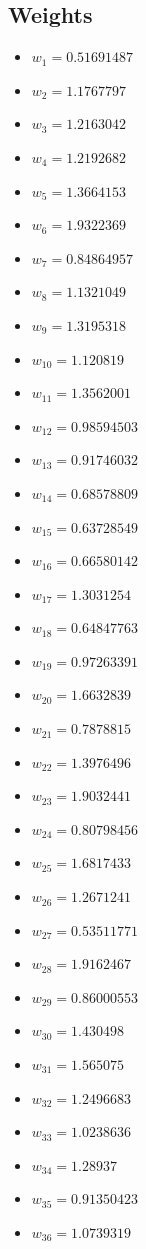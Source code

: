 \documentclass[11pt]{article}
\begin{document}
\subsection*{Weights}
\begin{itemize}
\item $w_{1} = 0.51691487$
\item $w_{2} = 1.1767797$
\item $w_{3} = 1.2163042$
\item $w_{4} = 1.2192682$
\item $w_{5} = 1.3664153$
\item $w_{6} = 1.9322369$
\item $w_{7} = 0.84864957$
\item $w_{8} = 1.1321049$
\item $w_{9} = 1.3195318$
\item $w_{10} = 1.120819$
\item $w_{11} = 1.3562001$
\item $w_{12} = 0.98594503$
\item $w_{13} = 0.91746032$
\item $w_{14} = 0.68578809$
\item $w_{15} = 0.63728549$
\item $w_{16} = 0.66580142$
\item $w_{17} = 1.3031254$
\item $w_{18} = 0.64847763$
\item $w_{19} = 0.97263391$
\item $w_{20} = 1.6632839$
\item $w_{21} = 0.7878815$
\item $w_{22} = 1.3976496$
\item $w_{23} = 1.9032441$
\item $w_{24} = 0.80798456$
\item $w_{25} = 1.6817433$
\item $w_{26} = 1.2671241$
\item $w_{27} = 0.53511771$
\item $w_{28} = 1.9162467$
\item $w_{29} = 0.86000553$
\item $w_{30} = 1.430498$
\item $w_{31} = 1.565075$
\item $w_{32} = 1.2496683$
\item $w_{33} = 1.0238636$
\item $w_{34} = 1.28937$
\item $w_{35} = 0.91350423$
\item $w_{36} = 1.0739319$

\end{itemize}
\end{document}
